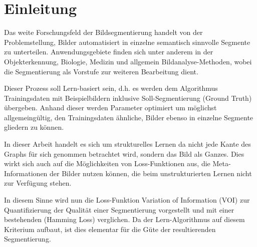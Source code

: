 \chapter{Einleitung}\label{ch:introduction}

Das weite Forschungsfeld der Bildsegmentierung handelt von der Problemstellung, Bilder automatisiert in einzelne semantisch sinnvolle Segmente zu unterteilen. Anwendungsgebiete finden sich unter anderem in der Objekterkennung, Biologie, Medizin und allgemein Bildanalyse-Methoden, wobei die Segmentierung als Vorstufe zur weiteren Bearbeitung dient. \\





\begin{figure}[H]
	\centering
	\hfill
\end{figure}
\vspace{-0.5cm}

\vspace{0.8cm}


Dieser Prozess soll Lern-basiert sein, d.h. es werden dem Algorithmus Trainingsdaten mit Beispielbildern inklusive Soll-Segmentierung (Ground Truth) übergeben. Anhand dieser werden Parameter optimiert um möglichst allgemeingültig, den Trainingsdaten ähnliche, Bilder ebenso in einzelne Segmente gliedern zu können.

In dieser Arbeit handelt es sich um strukturelles Lernen da nicht jede Kante des Graphs für sich genommen betrachtet wird, sondern das Bild als Ganzes. Dies wirkt sich auch auf die Möglichkeiten von Loss-Funktionen aus, die Meta-Informationen der Bilder nutzen können, die beim unstrukturierten Lernen nicht zur Verfügung stehen.

In diesem Sinne wird nun die Loss-Funktion Variation of Information (VOI) zur Quantifizierung der Qualität einer Segmentierung vorgestellt und mit einer bestehenden (Hamming Loss) verglichen. Da der Lern-Algorithmus auf diesem Kriterium aufbaut, ist dies elementar für die Güte der resultierenden Segmentierung.

\newpage

